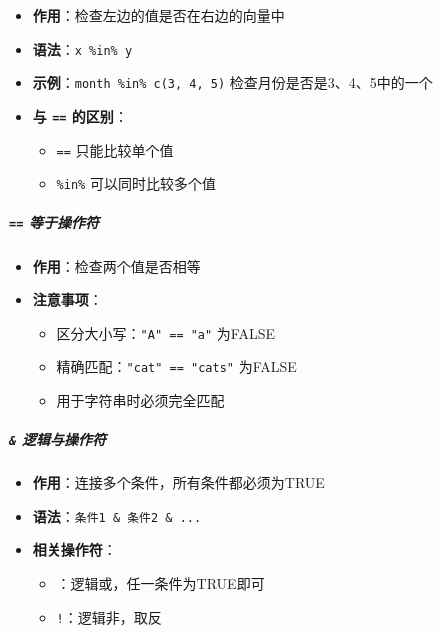 \documentclass[
]{book}
\providecommand{\tightlist}{%
  \setlength{\itemsep}{0pt}\setlength{\parskip}{0pt}}
\begin{document}
\begin{itemize}
\tightlist
\item
  \textbf{作用}：检查左边的值是否在右边的向量中
\item
  \textbf{语法}：\texttt{x\ \%in\%\ y}
\item
  \textbf{示例}：\texttt{month\ \%in\%\ c(3,\ 4,\ 5)} 检查月份是否是3、4、5中的一个
\item
  \textbf{与 \texttt{==} 的区别}：

  \begin{itemize}
  \tightlist
  \item
    \texttt{==} 只能比较单个值
  \item
    \texttt{\%in\%} 可以同时比较多个值
  \end{itemize}
\end{itemize}

\hypertarget{ux7b49ux4e8eux64cdux4f5cux7b26}{%
\subparagraph{\texorpdfstring{\texttt{==} 等于操作符}{== 等于操作符}}\label{ux7b49ux4e8eux64cdux4f5cux7b26}}

\begin{itemize}
\tightlist
\item
  \textbf{作用}：检查两个值是否相等
\item
  \textbf{注意事项}：

  \begin{itemize}
  \tightlist
  \item
    区分大小写：\texttt{"A"\ ==\ "a"} 为FALSE
  \item
    精确匹配：\texttt{"cat"\ ==\ "cats"} 为FALSE
  \item
    用于字符串时必须完全匹配
  \end{itemize}
\end{itemize}

\hypertarget{ux903bux8f91ux4e0eux64cdux4f5cux7b26}{%
\subparagraph{\texorpdfstring{\texttt{\&} 逻辑与操作符}{\& 逻辑与操作符}}\label{ux903bux8f91ux4e0eux64cdux4f5cux7b26}}

\begin{itemize}
\tightlist
\item
  \textbf{作用}：连接多个条件，所有条件都必须为TRUE
\item
  \textbf{语法}：\texttt{条件1\ \&\ 条件2\ \&\ ...}
\item
  \textbf{相关操作符}：

  \begin{itemize}
  \tightlist
  \item
    \texttt{\textbar{}}：逻辑或，任一条件为TRUE即可
  \item
    \texttt{!}：逻辑非，取反
  \end{itemize}
\end{itemize}
\end{document}
